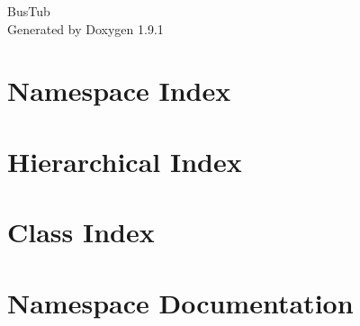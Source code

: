 \let\mypdfximage\pdfximage\def\pdfximage{\immediate\mypdfximage}\documentclass[twoside]{book}
\newcommand{\+}{\discretionary{\mbox{\scriptsize$\hookleftarrow$}}{}{}}
\newcommand{\clearemptydoublepage}{%
  \newpage{\pagestyle{empty}\cleardoublepage}%
}
\begin{document}
\raggedbottom

\hypersetup{pageanchor=false,
             bookmarksnumbered=true,
             pdfencoding=unicode
            }
\begin{titlepage}
\vspace*{7cm}
\begin{center}%
{\Large Bus\+Tub }\\
\vspace*{1cm}
{\large Generated by Doxygen 1.9.1}\\
\end{center}
\end{titlepage}
\clearemptydoublepage
{}
\tableofcontents
\clearemptydoublepage
{}
\hypersetup{pageanchor=true}

\chapter{Namespace Index}

\chapter{Hierarchical Index}

\chapter{Class Index}

\chapter{Namespace Documentation}

\end{document}
